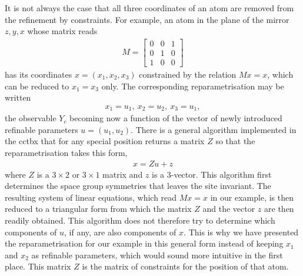 \documentclass[pdf]{iucr}
\begin{document}
It is not always the case that all three coordinates of an atom are removed from the refinement by constraints. For example, an atom in the plane of the mirror $z,y,x$ whose matrix reads
\begin{align}
M=\begin{bmatrix}
0 & 0 & 1\\
0 & 1 & 0\\
1 & 0 & 0
\end{bmatrix}
\end{align}
has its coordinates $x=(x_1, x_2, x_3)$ constrained by the relation $M x = x$, which can be reduced to $x_1 = x_3$ only. The corresponding reparametrisation may be written
\begin{align}
x_1 = u_1,\ x_2 = u_2,\ x_3 = u_1,
\label{eqn:specialposexamplereparam}
\end{align}
the observable $Y_c$ becoming now a function of the vector of newly introduced refinable parameters $u = (u_1, u_2)$. There is a general algorithm implemented in the cctbx that for any special position returns a matrix $Z$ so that the reparametrisation takes this form,
\begin{align}
x = Z u + z
\end{align}
where $Z$ is a $3 \times 2$ or $3 \times 1$ matrix and $z$ is a 3-vector. This algorithm first determines the space group symmetries that leaves the site invariant. The resulting system of linear equations, which read $M x = x$ in our example, is then reduced to a triangular form from which the matrix $Z$ and the vector $z$ are then readily obtained. This algorithm does not therefore try to determine which components of $u$, if any, are also components of $x$. This is why we have presented the reparametrisation for our example in this general form instead of keeping $x_1$ and $x_2$ as refinable parameters, which would sound more intuitive in the first place.
This matrix $Z$ is the matrix of constraints for the position of that atom.
\end{document}
